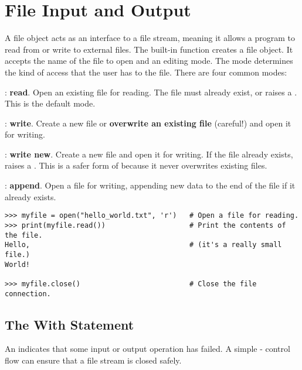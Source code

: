 \section*{File Input and Output} %

A file object acts as an interface to a file stream, meaning it allows a program to read from or write to external files.
The built-in function  creates a file object.
It accepts the name of the file to open and an editing mode.
The mode determines the kind of access that the user has to the file.
There are four common modes:
%
\begin{description}
\item {}: \textbf{read}.
Open an existing file for reading.
The file must already exist, or  raises a .
This is the default mode.
\item {}: \textbf{write}.
Create a new file or \textbf{overwrite an existing file} (careful!) and open it for writing.
\item {}: \textbf{write new}.
Create a new file and open it for writing.
If the file already exists,  raises a .
This is a safer form of  because it never overwrites existing files.
\item {}: \textbf{append}.
Open a file for writing, appending new data to the end of the file if it already exists.
\end{description}

\begin{lstlisting}
>>> myfile = open("hello_world.txt", 'r')   # Open a file for reading.
>>> print(myfile.read())                    # Print the contents of the file.
Hello,                                      # (it's a really small file.)
World!

>>> myfile.close()                          # Close the file connection.
\end{lstlisting}


\subsection*{The With Statement} %

An  indicates that some input or output operation has failed.
A simple - control flow can ensure that a file stream is closed safely.

